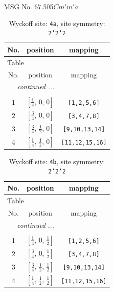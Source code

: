 \documentclass[fleqn,8pt]{jsarticle}
\begin{document}
\setcounter{MaxMatrixCols}{32}

\renewcommand{\tablename}{Table~}
\renewcommand{\figurename}{Figure~}
\begin{center}
\LARGE
MSG No. 67.505\quad$Cm'm'a$
\end{center}
\renewcommand{\arraystretch}{1.2}
\begin{longtable}{ccc}
\caption{Wyckoff site: {\tt 4a}, site symmetry: {\tt 2'2'2}}
 \\
 \hline \hline
No. & position & mapping \\ \hline \endfirsthead

\multicolumn{2}{l}{\tablename\ \thetable{}} \\
 \hline \hline
No. & position & mapping \\ \hline \endhead

 \hline \hline
\multicolumn{2}{r}{\footnotesize\it continued ...} \\ \endfoot

 \hline \hline
\multicolumn{2}{r}{} \\ \endlastfoot

1 & $\left[ \frac{1}{4},\, 0,\, 0 \right]$ & {\tt [1,2,5,6]} \\ \hline
2 & $\left[ \frac{3}{4},\, 0,\, 0 \right]$ & {\tt [3,4,7,8]} \\ \hline
3 & $\left[ \frac{3}{4},\, \frac{1}{2},\, 0 \right]$ & {\tt [9,10,13,14]} \\ \hline
4 & $\left[ \frac{1}{4},\, \frac{1}{2},\, 0 \right]$ & {\tt [11,12,15,16]} \\
\end{longtable}
\renewcommand{\arraystretch}{1.2}
\begin{longtable}{ccc}
\caption{Wyckoff site: {\tt 4b}, site symmetry: {\tt 2'2'2}}
 \\
 \hline \hline
No. & position & mapping \\ \hline \endfirsthead

\multicolumn{2}{l}{\tablename\ \thetable{}} \\
 \hline \hline
No. & position & mapping \\ \hline \endhead

 \hline \hline
\multicolumn{2}{r}{\footnotesize\it continued ...} \\ \endfoot

 \hline \hline
\multicolumn{2}{r}{} \\ \endlastfoot

1 & $\left[ \frac{1}{4},\, 0,\, \frac{1}{2} \right]$ & {\tt [1,2,5,6]} \\ \hline
2 & $\left[ \frac{3}{4},\, 0,\, \frac{1}{2} \right]$ & {\tt [3,4,7,8]} \\ \hline
3 & $\left[ \frac{3}{4},\, \frac{1}{2},\, \frac{1}{2} \right]$ & {\tt [9,10,13,14]} \\ \hline
4 & $\left[ \frac{1}{4},\, \frac{1}{2},\, \frac{1}{2} \right]$ & {\tt [11,12,15,16]} \\
\end{longtable}
\end{document}
